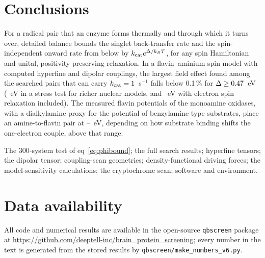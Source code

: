 \documentclass[journal=jpcbfk,manuscript=article,layout=traditional]{achemso}
\begin{document}
\section{Conclusions}

For a radical pair that an enzyme forms thermally and through which it turns
over, detailed balance bounds the singlet back-transfer rate and the
spin-independent onward rate from below by $k_{\rm cat}e^{\Delta/k_BT}$, for any
spin Hamiltonian and unital, positivity-preserving relaxation. In a
flavin--aminium spin model with computed hyperfine and dipolar couplings, the
largest field effect found among the searched pairs that can carry
$k_{\rm cat}=1$~s$^{-1}$ falls below 0.1\,\% for $\Delta\ge0.47$~eV
(\ThrTenthOneSens~eV in a stress test for richer nuclear models, and
\ThrTenthOneRelax~eV with electron spin relaxation included). The measured
flavin potentials of the monoamine oxidases, with a dialkylamine proxy for the
potential of benzylamine-type substrates, place an amine-to-flavin pair at
\DeltaMAOsubLo--\DeltaMAOhi~eV, depending on how substrate binding shifts the
one-electron couple, above that range.

\begin{suppinfo}
The 300-system test of eq~\ref{eq:phibound}; the full search results; hyperfine
tensors; the dipolar tensor; coupling-scan geometries; density-functional
driving forces; the model-sensitivity calculations; the cryptochrome scan;
software and environment.
\end{suppinfo}

\section*{Data availability}
All code and numerical results are available in the open-source \texttt{qbscreen}
package at \url{https://github.com/deeptell-inc/brain_protein_screening}; every
number in the text is generated from the stored results by
\texttt{qbscreen/make\_numbers\_v6.py}.


\end{document}
